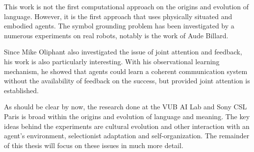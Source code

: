 \p
This work is not the first computational approach on the origins and evolution of language. However, it is the first approach that uses physically situated and embodied agents. The symbol grounding problem has been investigated by a numerous experiments on real robots, notably is the work of Aude Billard. 

Since Mike Oliphant also investigated the issue of joint attention and feedback, his work is also particularly interesting. With his observational learning mechanism, he showed that agents could learn a coherent communication system without the availability of feedback on the success, but provided joint attention is established.

\p
As should be clear by now, the research done at the VUB AI Lab and Sony CSL Paris is broad within the origins and evolution of language and meaning. The key ideas behind the experiments are cultural evolution and other interaction with an agent's environment, selectionist adaptation and self-organization. The remainder of this thesis will focus on these issues in much more detail.
